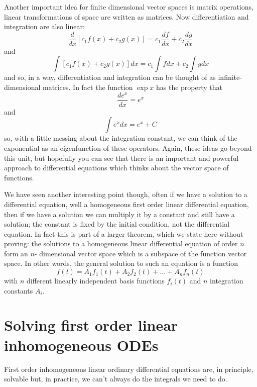 \documentclass[12pt]{article}
\begin{document}
Another important idea for finite dimensional vector spaces is
matrix operations, linear transformations of space are written as
matrices. Now differentiation and integration are also linear:
\begin{equation}
  \frac{d}{dx}[c_1f(x)+c_2g(x)]=c_1\frac{df}{dx}+c_2\frac{dg}{dx}
\end{equation}
and
\begin{equation}
  \int[c_1f(x)+c_2g(x)]dx=c_1\int f dx+c_2\int g dx
\end{equation}
and so, in a way, differentiation and integration can be thought of as
infinite-dimensional matrices. In fact the function $\exp{x}$ has the
property that
\begin{equation}
  \frac{de^x}{dx}=e^x
\end{equation}
and
\begin{equation}
  \int e^x dx = e^x+C
\end{equation}
so, with a little messing about the integration constant, we can think
of the exponential as an eigenfunction of these operators. Again,
these ideas go beyond this unit, but hopefully you can see that there
is an important and powerful approach to differential equations which
thinks about the vector space of functions.

We have seen another interesting point though, often if we have a
solution to a differential equation, well a homogeneous first order
linear differential equation, then if we have a solution we can
multiply it by a constant and still have a solution; the constant is
fixed by the initial condition, not the differential equation. In fact
this is part of a larger theorem, which we state here without proving: the solutions to a homogeneous linear differential equation of order $n$ form an $n$-
dimensional vector space which is a subspace of the function vector space. In other words, the
general solution to such an equation is a function
\begin{equation}
  f(t)=A_1f_1(t)+A_2f_2(t)+\ldots+A_nf_n(t)
\end{equation}
 with $n$ different linearly
independent basis functions $f_i(t)$ and $n$ integration constants $A_i$.

\section*{Solving first order linear inhomogeneous ODEs}
First order inhomogeneous linear ordinary differential equations are, in principle, solvable but, in practice, we can't always do the integrals we need to do.
\end{document}
